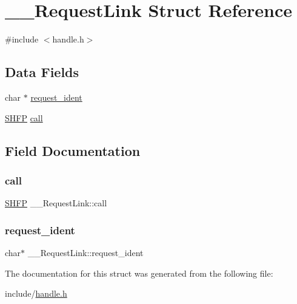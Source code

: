 \hypertarget{struct_____request_link}{}\section{\+\_\+\+\_\+\+Request\+Link Struct Reference}
\label{struct_____request_link}


{\ttfamily \#include $<$handle.\+h$>$}

\subsection*{Data Fields}
\begin{DoxyCompactItemize}
\item 
char $\ast$ \mbox{\hyperlink{struct_____request_link_ac6729255e75aaf3ad7a9f6f94d0e36e8}{request\+\_\+ident}}
\item 
\mbox{\hyperlink{handle_8h_a21ced4481879f31088fa333eedee03e1}{S\+H\+FP}} \mbox{\hyperlink{struct_____request_link_ae6808c43ccb87f560298a584449b7346}{call}}
\end{DoxyCompactItemize}


\subsection{Field Documentation}
\mbox{\label{struct_____request_link_ae6808c43ccb87f560298a584449b7346}} 
\subsubsection{\texorpdfstring{call}{call}}
{\footnotesize\ttfamily \mbox{\hyperlink{handle_8h_a21ced4481879f31088fa333eedee03e1}{S\+H\+FP}} \+\_\+\+\_\+\+Request\+Link\+::call}

\mbox{\label{struct_____request_link_ac6729255e75aaf3ad7a9f6f94d0e36e8}} 
\subsubsection{\texorpdfstring{request\+\_\+ident}{request\_ident}}
{\footnotesize\ttfamily char$\ast$ \+\_\+\+\_\+\+Request\+Link\+::request\+\_\+ident}



The documentation for this struct was generated from the following file\+:\begin{DoxyCompactItemize}
\item 
include/\mbox{\hyperlink{handle_8h}{handle.\+h}}\end{DoxyCompactItemize}
